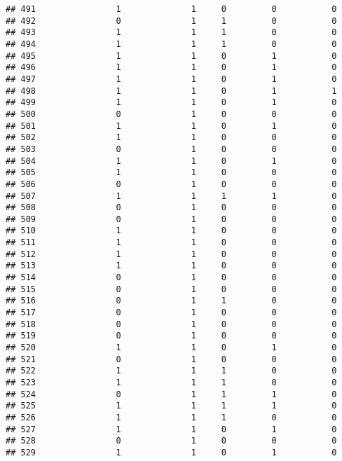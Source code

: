 \documentclass[]{article}
\begin{document}
\begin{verbatim}
## 491                1              1     0         0           0
## 492                0              1     1         0           0
## 493                1              1     1         0           0
## 494                1              1     1         0           0
## 495                1              1     0         1           0
## 496                1              1     0         1           0
## 497                1              1     0         1           0
## 498                1              1     0         1           1
## 499                1              1     0         1           0
## 500                0              1     0         0           0
## 501                1              1     0         1           0
## 502                1              1     0         0           0
## 503                0              1     0         0           0
## 504                1              1     0         1           0
## 505                1              1     0         0           0
## 506                0              1     0         0           0
## 507                1              1     1         1           0
## 508                0              1     0         0           0
## 509                0              1     0         0           0
## 510                1              1     0         0           0
## 511                1              1     0         0           0
## 512                1              1     0         0           0
## 513                1              1     0         0           0
## 514                0              1     0         0           0
## 515                0              1     0         0           0
## 516                0              1     1         0           0
## 517                0              1     0         0           0
## 518                0              1     0         0           0
## 519                0              1     0         0           0
## 520                1              1     0         1           0
## 521                0              1     0         0           0
## 522                1              1     1         0           0
## 523                1              1     1         0           0
## 524                0              1     1         1           0
## 525                1              1     1         1           0
## 526                1              1     1         0           0
## 527                1              1     0         1           0
## 528                0              1     0         0           0
## 529                1              1     0         1           0

\end{verbatim}
\end{document}
